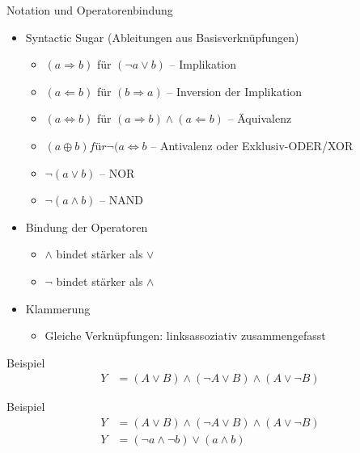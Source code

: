 \documentclass[12pt%
,aspectratio=169%
]{beamer}
\begin{document}
\begin{frame}{Notation und Operatorenbindung}
\begin{itemize}
	\item Syntactic Sugar (Ableitungen aus Basisverknüpfungen)
	\begin{itemize}
		\item $(a \Rightarrow b)$ für $(\neg a \lor b)$ -- Implikation
		\item $(a \Leftarrow b)$ für $(b \Rightarrow a)$ -- Inversion der Implikation
		\item $(a \Leftrightarrow b)$ für $(a \Rightarrow b) \land (a \Leftarrow b)$ -- Äquivalenz
		\item $(a \oplus b)  für ¬(a \Leftrightarrow b$ -- Antivalenz oder Exklusiv-ODER/XOR
		\item $\neg(a \lor b)$ -- NOR
		\item $\neg (a \land b)$ -- NAND
	\end{itemize}
	\item Bindung der Operatoren 
	\begin{itemize}
		\item $\land$ bindet stärker als $\lor$
		\item $\neg$ bindet stärker als $\land$
	\end{itemize}
	\item Klammerung
	\begin{itemize}
		\item Gleiche Verknüpfungen: linksassoziativ zusammengefasst
	\end{itemize}
\end{itemize}	 
\end{frame}

\begin{frame}{Beispiel}
\begin{align*}
Y &= (A \lor B) \land (\neg A \lor B) \land (A \lor \neg B)
\end{align*}
\end{frame}

\begin{frame}{Beispiel}
\begin{align*}
Y &= (A \lor B) \land (\neg A \lor B) \land (A \lor \neg B)\\
Y &= (\neg a \land \neg b) \lor (a \land b)
\end{align*}
\end{frame}
\end{document}
